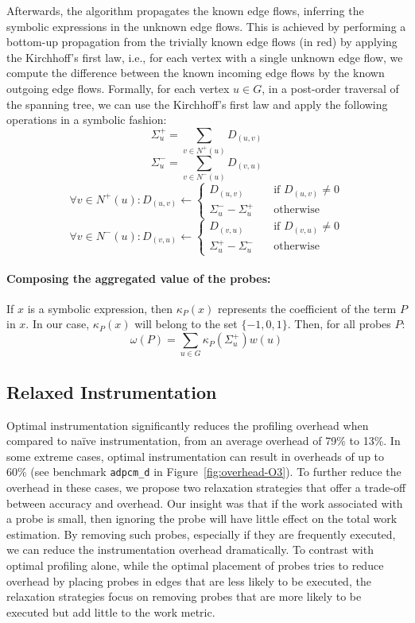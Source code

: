 Afterwards, the algorithm propagates the known edge flows, inferring
the symbolic expressions in the unknown edge flows.
This is achieved by performing a bottom-up propagation from the trivially known
edge flows (in red) by applying the Kirchhoff's first law, i.e.,
for each vertex with a single unknown edge flow, we compute the difference between
the known incoming edge flows by the known outgoing edge flows.
Formally,
for each vertex $u\in G$, in a post-order traversal of the spanning tree,
we can use the Kirchhoff's first law and apply the following operations
in a symbolic fashion:
\[
\Sigma^+_u = \sum_{v\in N^+(u)} D_{(u,v)}
\]
\[
\Sigma^-_u = \sum_{v\in N^-(u)} D_{(v,u)}
\]
\[
\forall v\in N^+(u):  D_{(u,v)} \gets
\begin{cases}
    D_{(u,v)} & \quad \text{if $D_{(u,v)}\neq 0$}\\
    \Sigma^-_u - \Sigma^+_u       & \quad \text{otherwise}
\end{cases}
\]
\[
\forall v\in N^-(u):  D_{(v,u)} \gets
\begin{cases}
    D_{(v,u)} & \quad \text{if $D_{(v,u)}\neq 0$}\\
    \Sigma^+_u - \Sigma^-_u       & \quad \text{otherwise}
\end{cases}
\]

\paragraph{Composing the aggregated value of the probes:}
If $x$ is a symbolic expression, then $\kappa_P(x)$ represents the coefficient
of the term $P$ in $x$.
In our case, $\kappa_P(x)$ will belong to the set $\{-1,0,1\}$.
Then, for all probes $P$:
\[
\omega(P) = \sum_{u\in G} \kappa_P(\Sigma^+_u)w(u)
\]

\subsection{Relaxed Instrumentation}

Optimal instrumentation significantly reduces the profiling overhead when compared to na\"ive instrumentation, from an average overhead of
79\% to 13\%. In some extreme cases, optimal instrumentation can result in overheads of up to 60\% (see benchmark \texttt{adpcm\_d} in
Figure~\ref{fig:overhead-O3}). To further reduce the overhead in these cases, we propose two relaxation strategies that offer a trade-off
between accuracy and overhead. Our insight was that if the work associated with a probe is small, then ignoring the probe will have little
effect on the total work estimation. By removing such probes, especially if they are frequently executed, we can reduce the instrumentation
overhead dramatically. To contrast with optimal profiling alone, while the optimal placement of probes tries to reduce overhead by placing
probes in edges that are less likely to be executed, the relaxation strategies focus on removing probes that are more likely to be executed
but add little to the work metric.

